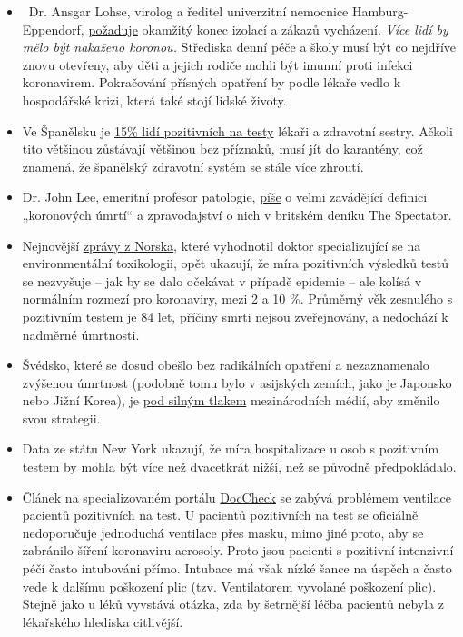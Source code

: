 \begin{itemize}
\tightlist
\item
  ~Dr. Ansgar Lohse, virolog a ředitel univerzitní nemocnice
  Hamburg-Eppendorf,
  \href{https://www.mopo.de/hamburg/uke-infektiologe-fordert-es-muessen-sich-mehr-menschen-mit-corona-infizieren-36483636}{požaduje}
  okamžitý konec izolací a zákazů vycházení. \emph{Více lidí by mělo být
  nakaženo koronou.} Střediska denní péče a školy musí být co nejdříve
  znovu otevřeny, aby děti a jejich rodiče mohli být imunní proti
  infekci koronavirem. Pokračování přísných opatření by podle lékaře
  vedlo k hospodářské krizi, která také stojí lidské životy.
\item
  Ve Španělsku je
  \href{https://www.heise.de/tp/features/Das-ist-keine-Krise-sondern-eine-Katastrophe-4694104.html}{15\%
  lidí pozitivních na testy} lékaři a zdravotní sestry. Ačkoli tito
  většinou zůstávají většinou bez příznaků, musí jít do karantény, což
  znamená, že španělský zdravotní systém se stále více zhroutí.
\item
  Dr. John Lee, emeritní profesor patologie,
  \href{https://www.spectator.co.uk/article/how-to-understand-and-report-figures-for-covid-19-deaths-}{píše}
  o velmi zavádějící definici „koronových úmrtí`` a zpravodajství o nich
  v britském deníku The Spectator.
\item
  Nejnovější
  \href{https://swprs.files.wordpress.com/2020/04/die-lage-in-norwegen.pdf}{zprávy
  z Norska}, které vyhodnotil doktor specializující se na
  environmentální toxikologii, opět ukazují, že míra pozitivních
  výsledků testů se nezvyšuje -- jak by se dalo očekávat v případě
  epidemie -- ale kolísá v normálním rozmezí pro koronaviry, mezi 2 a 10
  \%. Průměrný věk zesnulého s pozitivním testem je 84 let, příčiny
  smrti nejsou zveřejnovány, a nedochází k nadměrné úmrtnosti.
\item
  Švédsko, které se dosud obešlo bez radikálních opatření a
  nezaznamenalo zvýšenou úmrtnost (podobně tomu bylo v asijských zemích,
  jako je Japonsko nebo Jižní Korea), je
  \href{https://www.theguardian.com/world/2020/mar/30/catastrophe-sweden-coronavirus-stoicism-lockdown-europe}{pod
  silným tlakem} mezinárodních médií, aby změnilo svou strategii.
\item
  Data ze státu New York ukazují, že míra hospitalizace u osob s
  pozitivním testem by mohla být
  \href{https://www.nytimes.com/2020/03/27/nyregion/new-rochelle-coronavirus.html}{více
  než dvacetkrát nižší}, než se původně předpokládalo.
\item
  Článek na specializovaném portálu
  \href{https://www.doccheck.com/de/detail/articles/26271-covid-19-beatmung-und-dann}{DocCheck}
  se zabývá problémem ventilace pacientů pozitivních na test. U pacientů
  pozitivních na test se oficiálně nedoporučuje jednoduchá ventilace
  přes masku, mimo jiné proto, aby se zabránilo šíření koronaviru
  aerosoly. Proto jsou pacienti s pozitivní intenzivní péčí často
  intubováni přímo. Intubace má však nízké šance na úspěch a často vede
  k dalšímu poškození plic (tzv. Ventilatorem vyvolané poškození plic).
  Stejně jako u léků vyvstává otázka, zda by šetrnější léčba pacientů
  nebyla z lékařského hlediska citlivější.
\end{itemize}

